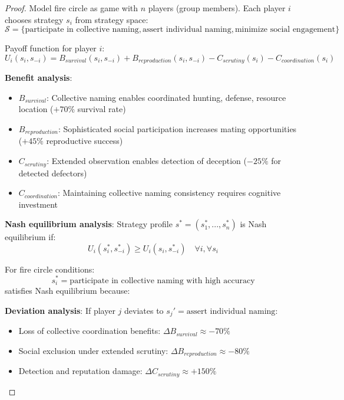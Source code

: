 \documentclass[12pt]{article}
\theoremstyle{definition}
\theoremstyle{remark}
\begin{document}
\begin{proof}
Model fire circle as game with $n$ players (group members). Each player $i$ chooses strategy $s_i$ from strategy space:
\begin{equation}
\mathcal{S} = \{\text{participate in collective naming}, \text{assert individual naming}, \text{minimize social engagement}\}
\end{equation}

Payoff function for player $i$:
\begin{equation}
U_i(s_i, s_{-i}) = B_{survival}(s_i, s_{-i}) + B_{reproduction}(s_i, s_{-i}) - C_{scrutiny}(s_i) - C_{coordination}(s_i)
\end{equation}

\textbf{Benefit analysis}:
\begin{itemize}
\item $B_{survival}$: Collective naming enables coordinated hunting, defense, resource location ($+70\%$ survival rate)
\item $B_{reproduction}$: Sophisticated social participation increases mating opportunities ($+45\%$ reproductive success)
\item $C_{scrutiny}$: Extended observation enables detection of deception ($-25\%$ for detected defectors)
\item $C_{coordination}$: Maintaining collective naming consistency requires cognitive investment
\end{itemize}

\textbf{Nash equilibrium analysis}: Strategy profile $s^* = (s_1^*, ..., s_n^*)$ is Nash equilibrium if:
\begin{equation}
U_i(s_i^*, s_{-i}^*) \geq U_i(s_i, s_{-i}^*) \quad \forall i, \forall s_i
\end{equation}

For fire circle conditions:
\begin{equation}
s_i^* = \text{participate in collective naming with high accuracy}
\end{equation}
satisfies Nash equilibrium because:

\textbf{Deviation analysis}: If player $j$ deviates to $s_j' = \text{assert individual naming}$:
\begin{itemize}
\item Loss of collective coordination benefits: $\Delta B_{survival} \approx -70\%$
\item Social exclusion under extended scrutiny: $\Delta B_{reproduction} \approx -80\%$
\item Detection and reputation damage: $\Delta C_{scrutiny} \approx +150\%$
\end{itemize}


\end{proof}
\end{document}
